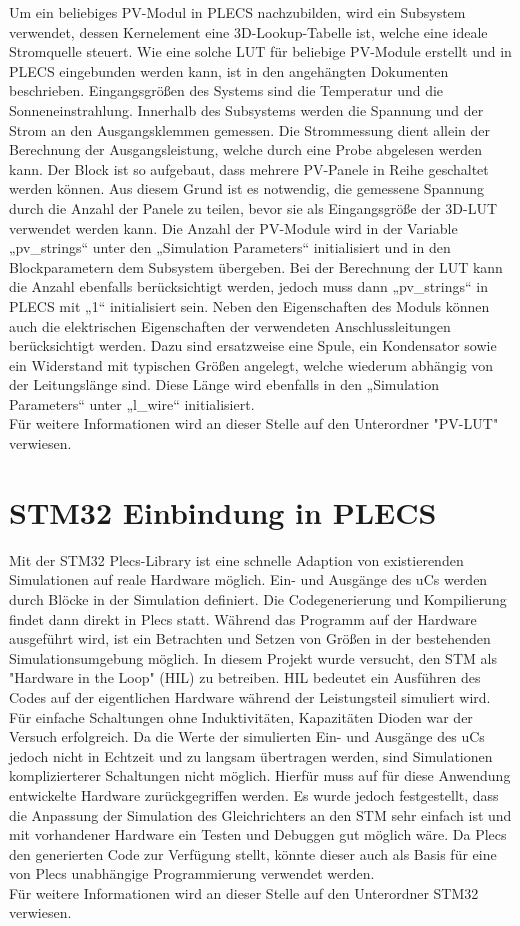\documentclass[a4paper,11pt,oneside]{article}
\begin{document}
Um ein beliebiges PV-Modul in PLECS nachzubilden, wird ein Subsystem verwendet, dessen Kernelement eine 3D-Lookup-Tabelle ist, welche eine ideale Stromquelle steuert. Wie eine solche LUT für beliebige PV-Module erstellt und in PLECS eingebunden werden kann, ist in den angehängten Dokumenten beschrieben. Eingangsgrößen des Systems sind die Temperatur und die Sonneneinstrahlung. 
Innerhalb des Subsystems werden die Spannung und der Strom an den Ausgangsklemmen gemessen. Die Strommessung dient allein der Berechnung der Ausgangsleistung, welche durch eine Probe abgelesen werden kann. 
Der Block ist so aufgebaut, dass mehrere PV-Panele in Reihe geschaltet werden können. Aus diesem Grund ist es notwendig, die gemessene Spannung durch die Anzahl der Panele zu teilen, bevor sie als Eingangsgröße der 3D-LUT verwendet werden kann. Die Anzahl der PV-Module wird in der Variable „pv\_strings“ unter den „Simulation Parameters“ initialisiert und in den Blockparametern dem Subsystem übergeben. Bei der Berechnung der LUT kann die Anzahl ebenfalls berücksichtigt werden, jedoch muss dann „pv\_strings“ in PLECS mit „1“ initialisiert sein.
Neben den Eigenschaften des Moduls können auch die elektrischen Eigenschaften der verwendeten Anschlussleitungen berücksichtigt werden. Dazu sind ersatzweise eine Spule, ein Kondensator sowie ein Widerstand mit typischen Größen angelegt, welche wiederum abhängig von der Leitungslänge sind. Diese Länge wird ebenfalls in den „Simulation Parameters“ unter „l\_wire“ initialisiert.\\Für weitere Informationen wird an dieser Stelle auf den Unterordner "PV-LUT" verwiesen.

\section{STM32 Einbindung in PLECS}
Mit der STM32 Plecs-Library ist eine schnelle Adaption von existierenden Simulationen auf reale Hardware möglich. Ein- und Ausgänge des uCs werden durch Blöcke in der Simulation definiert. Die Codegenerierung und Kompilierung findet dann direkt in Plecs statt. Während das Programm auf der Hardware ausgeführt wird, ist ein Betrachten und Setzen von Größen in der bestehenden Simulationsumgebung möglich. 
In diesem Projekt wurde versucht, den STM als "Hardware in the Loop" (HIL) zu betreiben. HIL bedeutet ein Ausführen des Codes auf der eigentlichen Hardware während der Leistungsteil simuliert wird. Für einfache Schaltungen ohne Induktivitäten, Kapazitäten Dioden war der Versuch erfolgreich. Da die Werte der simulierten Ein- und Ausgänge des uCs jedoch nicht in Echtzeit und zu langsam übertragen werden, sind Simulationen komplizierterer Schaltungen nicht möglich. Hierfür muss auf für diese Anwendung entwickelte Hardware zurückgegriffen werden. Es wurde jedoch festgestellt, dass die Anpassung der Simulation des Gleichrichters an den STM sehr einfach ist und mit vorhandener Hardware ein Testen und Debuggen gut möglich wäre. Da Plecs den generierten Code zur Verfügung stellt, könnte dieser auch als Basis für eine von Plecs unabhängige Programmierung verwendet werden.\\Für weitere Informationen wird an dieser Stelle auf den Unterordner STM32 verwiesen.
\end{document}

